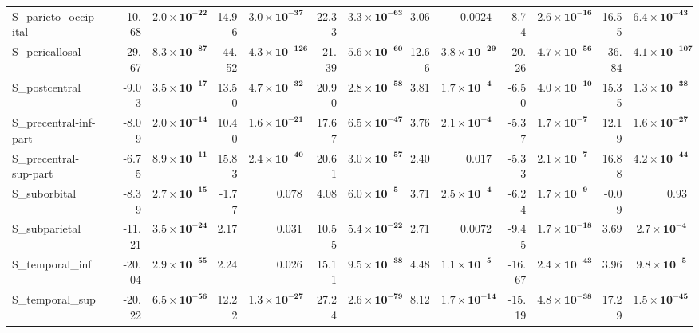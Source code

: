 {\begin{longtable}{llrrrrrrrrrrrr}
S\_parieto\_occipital &  & -10.68 & $\mathbf{2.0{\times}10^{-22}}$ & 14.96 & $\mathbf{3.0{\times}10^{-37}}$ & 22.33 & $\mathbf{3.3{\times}10^{-63}}$ & 3.06 & $0.0024$ & -8.74 & $\mathbf{2.6{\times}10^{-16}}$ & 16.55 & $\mathbf{6.4{\times}10^{-43}}$ \\
S\_pericallosal &  & -29.67 & $\mathbf{8.3{\times}10^{-87}}$ & -44.52 & $\mathbf{4.3{\times}10^{-126}}$ & -21.39 & $\mathbf{5.6{\times}10^{-60}}$ & 12.66 & $\mathbf{3.8{\times}10^{-29}}$ & -20.26 & $\mathbf{4.7{\times}10^{-56}}$ & -36.84 & $\mathbf{4.1{\times}10^{-107}}$ \\
S\_postcentral &  & -9.03 & $\mathbf{3.5{\times}10^{-17}}$ & 13.50 & $\mathbf{4.7{\times}10^{-32}}$ & 20.90 & $\mathbf{2.8{\times}10^{-58}}$ & 3.81 & $\mathbf{1.7{\times}10^{-4}}$ & -6.50 & $\mathbf{4.0{\times}10^{-10}}$ & 15.35 & $\mathbf{1.3{\times}10^{-38}}$ \\
S\_precentral-inf-part &  & -8.09 & $\mathbf{2.0{\times}10^{-14}}$ & 10.40 & $\mathbf{1.6{\times}10^{-21}}$ & 17.67 & $\mathbf{6.5{\times}10^{-47}}$ & 3.76 & $\mathbf{2.1{\times}10^{-4}}$ & -5.37 & $\mathbf{1.7{\times}10^{-7}}$ & 12.19 & $\mathbf{1.6{\times}10^{-27}}$ \\
S\_precentral-sup-part &  & -6.75 & $\mathbf{8.9{\times}10^{-11}}$ & 15.83 & $\mathbf{2.4{\times}10^{-40}}$ & 20.61 & $\mathbf{3.0{\times}10^{-57}}$ & 2.40 & $0.017$ & -5.33 & $\mathbf{2.1{\times}10^{-7}}$ & 16.88 & $\mathbf{4.2{\times}10^{-44}}$ \\
S\_suborbital &  & -8.39 & $\mathbf{2.7{\times}10^{-15}}$ & -1.77 & $0.078$ & 4.08 & $\mathbf{6.0{\times}10^{-5}}$ & 3.71 & $\mathbf{2.5{\times}10^{-4}}$ & -6.24 & $\mathbf{1.7{\times}10^{-9}}$ & -0.09 & $0.93$ \\
S\_subparietal &  & -11.21 & $\mathbf{3.5{\times}10^{-24}}$ & 2.17 & $0.031$ & 10.55 & $\mathbf{5.4{\times}10^{-22}}$ & 2.71 & $0.0072$ & -9.45 & $\mathbf{1.7{\times}10^{-18}}$ & 3.69 & $\mathbf{2.7{\times}10^{-4}}$ \\
S\_temporal\_inf &  & -20.04 & $\mathbf{2.9{\times}10^{-55}}$ & 2.24 & $0.026$ & 15.11 & $\mathbf{9.5{\times}10^{-38}}$ & 4.48 & $\mathbf{1.1{\times}10^{-5}}$ & -16.67 & $\mathbf{2.4{\times}10^{-43}}$ & 3.96 & $\mathbf{9.8{\times}10^{-5}}$ \\
S\_temporal\_sup &  & -20.22 & $\mathbf{6.5{\times}10^{-56}}$ & 12.22 & $\mathbf{1.3{\times}10^{-27}}$ & 27.24 & $\mathbf{2.6{\times}10^{-79}}$ & 8.12 & $\mathbf{1.7{\times}10^{-14}}$ & -15.19 & $\mathbf{4.8{\times}10^{-38}}$ & 17.29 & $\mathbf{1.5{\times}10^{-45}}$ \\

\end{longtable}}
